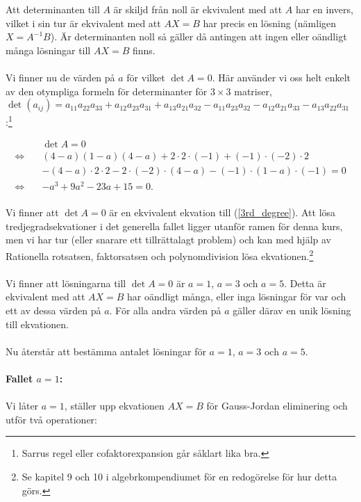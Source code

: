 \documentclass{article}
\begin{document}
\noindent Att determinanten till $A$ är skiljd från noll är ekvivalent med att $A$ har en invers, vilket i sin tur är ekvivalent med att $AX = B$ har precis en lösning (nämligen $X = A^{-1}B$). Är determinanten noll så gäller då antingen att ingen eller oändligt många lösningar till $AX = B$ finns.
\\
\\
Vi finner nu de värden på $a$ för vilket $\det A = 0$. Här använder vi oss helt enkelt av den otympliga formeln för determinanter för $3\times3$ matriser, $\det (a_{ij}) = a_{11} a_{22} a_{33} + a_{12} a_{23} a_{31} + a_{13} a_{21} a_{32} - a_{11} a_{23} a_{32} - a_{12} a_{21} a_{33} - a_{13} a_{22} a_{31} $:\footnote{Sarrus regel eller cofaktorexpansion går såklart lika bra.}

\begin{align}
  &\det A = 0\nonumber\\
  \iff \quad &(4 - a)(1 - a)(4 - a) + 2\cdot2\cdot(-1) + (-1)\cdot(-2)\cdot2\nonumber\\
  &- (4 - a)\cdot2\cdot2 - 2\cdot(-2)\cdot(4 - a) - (-1)\cdot(1 - a)\cdot(-1) = 0\nonumber\\
  \iff \quad &-a^{3} + 9a^{2} -23a +15 = 0\text{.} \label{3rd_degree}
\end{align}
\\
Vi finner att $\det A = 0$ är en ekvivalent ekvation till (\ref{3rd_degree}). Att lösa tredjegradsekvationer i det generella fallet ligger utanför ramen för denna kurs, men vi har tur (eller snarare ett tillrättalagt problem) och kan med hjälp av Rationella rotsatsen, faktorsatsen och polynomdivision lösa ekvationen.\footnote{Se kapitel 9 och 10 i algebrkompendiumet för en redogörelse för hur detta görs.}
\\
\\
Vi finner att lösningarna till $\det A = 0$ är $a = 1$, $a = 3$ och $a = 5$. Detta är ekvivalent med att $AX = B$ har oändligt många, eller inga lösningar för var och ett av dessa värden på $a$. För alla andra värden på $a$ gäller därav en unik lösning till ekvationen.
\\
\\
Nu återstår att bestämma antalet lösningar för $a = 1$, $a = 3$ och $a = 5$.
\\
\\
\textbf{Fallet $a = 1$:}
\\
\\
Vi låter $a = 1$, ställer upp ekvationen $AX = B$ för Gauss-Jordan eliminering och utför två operationer:
\end{document}

